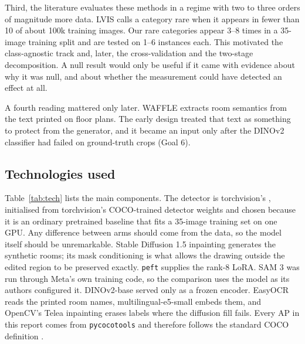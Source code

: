 Third, the literature evaluates these methods in a regime with two to three
orders of magnitude more data. LVIS \cite{gupta2019lvis} calls a category rare
when it appears in fewer than 10 of about 100k training images. Our rare
categories appear 3--8 times in a 35-image training split and are tested on 1--6
instances each. This motivated the class-agnostic track and, later, the
cross-validation and the two-stage decomposition. A null result would only be
useful if it came with evidence about why it was null, and about whether the
measurement could have detected an effect at all.

A fourth reading mattered only later. WAFFLE \cite{ganon2025waffle} extracts
room semantics from the text printed on floor plans. The early design treated
that text as something to protect from the generator, and it became an input
only after the DINOv2 classifier had failed on ground-truth crops (Goal 6).

\subsection{Technologies used}

Table~\ref{tab:tech} lists the main components. The detector is torchvision's
\protect{}, initialised from torchvision's COCO-trained detector weights and chosen because it
is an ordinary pretrained baseline that fits a 35-image training set on one GPU.
Any difference between arms should come from the data, so the model itself
should be unremarkable. Stable Diffusion 1.5 inpainting generates the synthetic
rooms; its mask conditioning is what allows the drawing outside the edited
region to be preserved exactly. \texttt{peft} supplies the rank-8 LoRA. SAM 3
was run through Meta's own training code, so the comparison uses the model as
its authors configured it. DINOv2-base served only
as a frozen encoder. EasyOCR reads the printed room names, multilingual-e5-small
embeds them, and OpenCV's Telea inpainting erases labels where the diffusion
fill fails. Every AP in this report comes from \texttt{pycocotools} and
therefore follows the standard COCO definition \cite{lin2014coco}.

